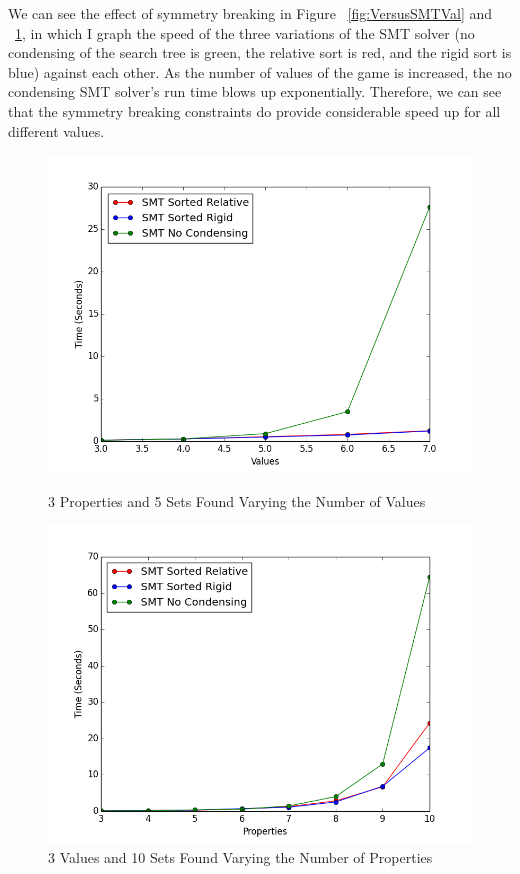 \documentclass[pageno]{jpaper}
\begin{document}
We can see the effect of symmetry breaking in Figure ~\ref{fig:VersusSMTVal} and ~\ref{fig:VersusSMTProp}, in which I graph the speed of the three variations of the SMT solver (no condensing of the search tree is green, the relative sort is red, and the rigid sort is blue) against each other. As the number of values of the game is increased, the no condensing SMT solver's run time blows up exponentially. Therefore, we can see that the symmetry breaking constraints do provide considerable speed up for all different values. 

\begin{figure}[htbb]
\begin{minipage}[b]{0.5\linewidth}
\centering
\includegraphics[width=.75\linewidth]{VersusSMTVAL-v34567p3n5.png}
\caption{3 Properties and 5 Sets Found Varying the Number of Values}
\label{fig:VersusSMTVal}
\end{minipage}
\hspace{0.5cm}
\begin{minipage}[b]{0.5\linewidth}
\centering
\includegraphics[width=.75\linewidth]{VersusSMTPROP-v3p345678910n5.png}
\caption{3 Values and 10 Sets Found Varying the Number of Properties}
\label{fig:VersusSMTProp}
\end{minipage}
\end{figure}
\end{document}

